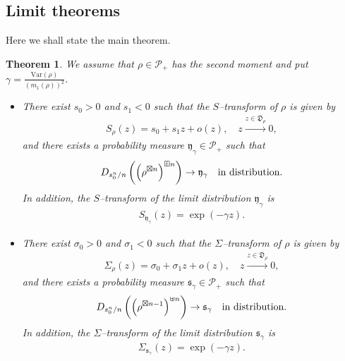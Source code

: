 \documentclass[12pt]{amsart}
\newtheorem{thm}{Theorem}[section]
\theoremstyle{definition}
\numberwithin{equation}{section}
\begin{document}
\subsection{Limit theorems}
Here we shall state the main theorem.
\begin{thm}\label{maintheorem}
We assume that 
$\rho \in \mathcal{P}_+$ has the second moment
and put
$\gamma = \frac{\mathrm{Var}(\rho)}{(m_{1}(\rho))^{2}}$.
\begin{itemize}
\item[\rm{(1)}] 
There exist $s_0>0$ and $s_1<0$ such that
the $S$--transform of $\rho$ is given by
\begin{align*}
S_{\rho}(z) = s_0 +  s_{1}z + o(z),   \quad
z \overset{z\in \mathfrak{D}_{\rho}}{\longrightarrow} 0,
\end{align*} 
and there exists a probability measure 
$\mathfrak{y}_{\gamma} \in \mathcal{P}_+$ 
such that
\begin{align*}
D_{s_0^n/n}\left(\left(\rho^{\boxtimes n}\right)^{\boxplus n}\right) 
\to \mathfrak{y}_{\gamma} \quad \mbox{{\rm in distribution}}.
\end{align*}
In addition, the $S$--transform of the limit distribution $\mathfrak{y}_{\gamma}$ is
\begin{align*}
S_{\mathfrak{y}_{\gamma}}(z) = \exp\left(-\gamma  z \right).
\end{align*} 

\item[\rm{(2)}]
There exist $\sigma_0>0$ and $\sigma_1<0$ such that
the $\Sigma$--transform of $\rho$ is given by
\begin{align*}
\Sigma_{\rho}(z) = \sigma_0 +  \sigma_{1}z + o(z),  \quad
z \overset{z\in \mathfrak{D}_{\rho}}{\longrightarrow} 0,
\end{align*} 
and there exists a probability measure 
$\mathfrak{s}_{\gamma} \in \mathcal{P}_+$ 
such that
\begin{align*}
D_{s_0^n/n}\left(\left(\rho^{\boxtimes n-1}\right)^{\uplus n}\right) 
\to \mathfrak{s}_{\gamma}  \quad \mbox{{\rm in distribution}}.
\end{align*}
In addition, the $\Sigma$--transform of the limit distribution $\mathfrak{s}_{\gamma}$ is
\begin{align*}
\Sigma_{\mathfrak{s}_{\gamma}}(z) = \exp\left(-\gamma  z \right).
\end{align*}
\end{itemize} 
\end{thm}
\end{document}
